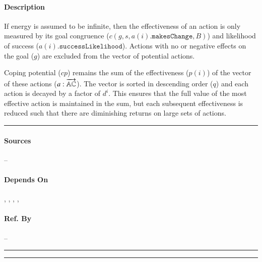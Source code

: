\paragraph{Description} If energy is assumed to be infinite, then the
effectiveness of an action is only measured by its goal congruence ($c(g,
s,
a(i).\mathtt{makesChange}, B)$) and likelihood of success
($a(i).\mathtt{successLikelihood}$). Actions with no or negative effects on
the
goal ($g$) are excluded from the vector of potential actions.

Coping potential ($cp$) remains the sum of the effectiveness ($p(i)$) of
the
vector of these actions ($a : \overrightarrow{\mathbb{AC}}$). The vector is
sorted in descending order ($q$) and each action is decayed by a factor of
$d^i$. This ensures that the full value of the most effective action is
maintained in the sum, but each subsequent effectiveness is reduced such
that
there are diminishing returns on large sets of actions. \\\hrule

\paragraph{Sources} --

\paragraph{Depends On} , , 
, , 

\paragraph{Ref. By} -- \\\hrule\vspace{0.5mm}\hrule

~\newline

